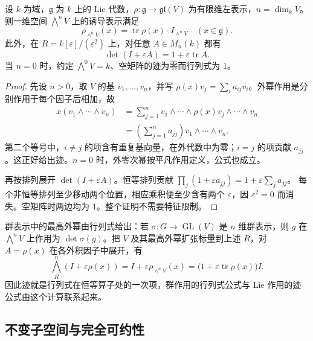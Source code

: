 \begin{proposition}[最高外幂上的迹]\label{b5:prop:lie-top-exterior-trace}
	设 \(k\) 为域，\(\mathfrak g\) 为 \(k\) 上的 Lie 代数，\(\rho:\mathfrak g\to\mathfrak{gl}(V)\) 为有限维左表示，\(n=\dim_kV\)。则一维空间 \(\bigwedge^nV\) 上的诱导表示满足
	\[
		\rho_{\wedge^nV}(x) =\operatorname{tr}\rho(x)\cdot I_{\wedge^nV} \quad(x\in\mathfrak g).
	\]
	此外，在 \(R=k[\varepsilon]/(\varepsilon^2)\) 上，对任意 \(A\in M_n(k)\) 都有
	\[
		\det(I+\varepsilon A)=1+\varepsilon\operatorname{tr}A.
	\]
	当 \(n=0\) 时，约定 \(\bigwedge^0V=k\)、空矩阵的迹为零而行列式为 \(1\)。
\end{proposition}
\begin{proof}
	先设 \(n>0\)，取 \(V\) 的基 \(v_1,\ldots,v_n\)，并写 \(\rho(x)v_j=\sum_i a_{ij}v_i\)。外幂作用是分别作用于每个因子后相加，故
	\[
		\begin{aligned}
			x(v_1\wedge\cdots\wedge v_n) &=\sum_{j=1}^n v_1\wedge\cdots\wedge\rho(x)v_j\wedge\cdots\wedge v_n\\
			&=\left(\sum_{j=1}^n a_{jj}\right) v_1\wedge\cdots\wedge v_n.
		\end{aligned}
	\]
	第二个等号中，\(i\ne j\) 的项含有重复基向量，在外代数中为零；\(i=j\) 的项贡献 \(a_{jj}\)。这正好给出迹。\(n=0\) 时，外零次幂按平凡作用定义，公式也成立。

	再按排列展开 \(\det(I+\varepsilon A)\)。恒等排列贡献 \(\prod_j(1+\varepsilon a_{jj})=1+\varepsilon\sum_j a_{jj}\)。 每个非恒等排列至少移动两个位置，相应乘积便至少含有两个 \(\varepsilon\)，因 \(\varepsilon^2=0\) 而消失。空矩阵时两边均为 \(1\)。整个证明不需要特征限制。
\end{proof}

群表示中的最高外幂由行列式给出：若 \(\sigma:G\to\operatorname{GL}(V)\) 是 \(n\) 维群表示，则 \(g\) 在 \(\bigwedge^nV\) 上作用为 \(\det\sigma(g)\)。把 \(V\) 及其最高外幂扩张标量到上述 \(R\)，对 \(A=\rho(x)\) 在各外积因子中展开，有
\[
	\bigwedge_R^n(I+\varepsilon\rho(x)) =I+\varepsilon\rho_{\wedge^nV}(x) =\bigl(1+\varepsilon\operatorname{tr}\rho(x)\bigr)I.
\]
因此迹就是行列式在恒等算子处的一次项，群作用的行列式公式与 Lie 作用的迹公式由这个计算联系起来。

\subsection{不变子空间与完全可约性}
\label{b5:subsec:1103:03}

